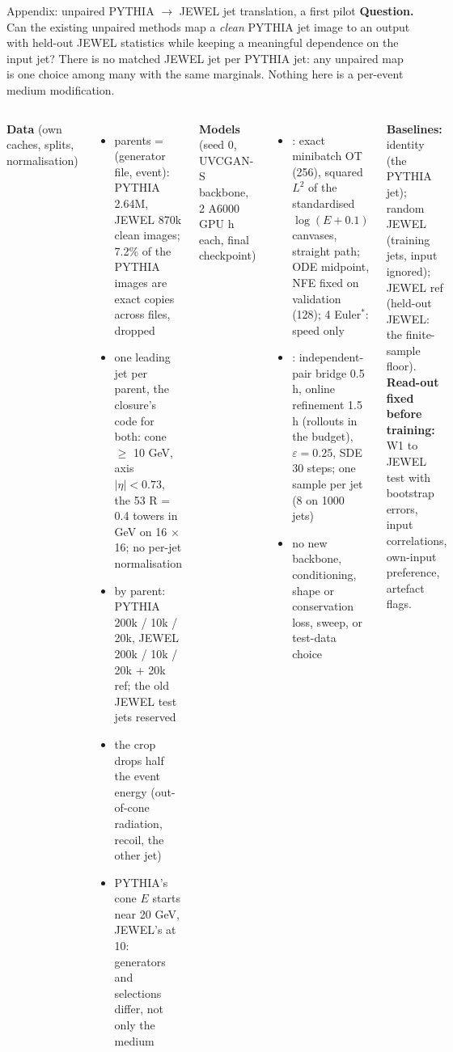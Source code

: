 
\begin{frame}{Appendix: unpaired PYTHIA $\to$ JEWEL jet translation, a first pilot}
\small
\textbf{Question.} Can the existing unpaired methods map a \emph{clean} PYTHIA jet image to an output with
held-out JEWEL statistics while keeping a meaningful dependence on the input jet? There is no matched JEWEL jet
per PYTHIA jet: any unpaired map is one choice among many with the same marginals. Nothing here is a per-event
medium modification.

\vspace{0.2em}
\begin{columns}[T]
\footnotesize
\textbf{Data} (own caches, splits, normalisation)
\begin{itemize}\setlength\itemsep{0.0em}
\item parents = (generator file, event): PYTHIA 2.64M, JEWEL 870k clean images; 7.2\% of the PYTHIA images
  are exact copies across files, dropped
\item one leading jet per parent, the closure's code for both: cone $\ge$ 10 GeV, axis $|\eta| < 0.73$, the
  53 R = 0.4 towers in GeV on 16 $\times$ 16; no per-jet normalisation
\item by parent: PYTHIA 200k / 10k / 20k, JEWEL 200k / 10k / 20k + 20k ref; the old JEWEL test jets reserved
\item the crop drops half the event energy (out-of-cone radiation, recoil, the other jet)
\item PYTHIA's cone $E$ starts near 20 GeV, JEWEL's at 10: generators and selections differ, not only the
  medium
\end{itemize}
\footnotesize
\textbf{Models} (seed 0, UVCGAN-S backbone, 2 A6000 GPU h each, final checkpoint)
\begin{itemize}\setlength\itemsep{0.0em}
\item \ot{}: exact minibatch OT (256), squared $L^2$ of the standardised $\log(E + 0.1)$ canvases, straight
  path; ODE midpoint, NFE fixed on validation (128); 4 Euler$^\ast$: speed only
\item \dsbm{}: independent-pair bridge 0.5 h, online refinement 1.5 h (rollouts in the budget),
  $\varepsilon = 0.25$, SDE 30 steps; one sample per jet (8 on 1000 jets)
\item no new backbone, conditioning, shape or conservation loss, sweep, or test-data choice
\end{itemize}
\textbf{Baselines:} identity (the PYTHIA jet); random JEWEL (training jets, input ignored); JEWEL ref (held-out
JEWEL: the finite-sample floor).\\
\textbf{Read-out fixed before training:} W1 to JEWEL test with bootstrap errors, input correlations,
own-input preference, artefact flags.
\end{columns}
\end{frame}

